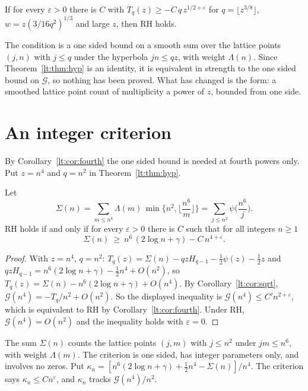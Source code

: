 \begin{corollary}[Reduction]\label{lt:cor:red}
If for every $\varepsilon>0$ there is $C$ with $\overline T_q(z)\ge-C\,q\,z^{1/2+\varepsilon}$ for $q=\lfloor z^{3/8}\rfloor$, $w=z(3/16q^2)^{1/3}$ and large $z$, then RH holds.
\end{corollary}

The condition is a one sided bound on a smooth sum over the lattice points $(j,n)$ with $j\le q$ under the hyperbola $jn\le qz$, with weight $\Lambda(n)$. Since Theorem~\ref{lt:thm:hyp} is an identity, it is equivalent in strength to the one sided bound on $\mathcal G$, so nothing has been proved. What has changed is the form: a smoothed lattice point count of multiplicity a power of $z$, bounded from one side.

\section{An integer criterion}\label{lt:sec:int}
By Corollary~\ref{lt:cor:fourth} the one sided bound is needed at fourth powers only. Put $z=n^4$ and $q=n^2$ in Theorem~\ref{lt:thm:hyp}.

\begin{theorem}\label{lt:thm:int}
Let
\[
\Sigma(n)=\sum_{m\le n^6}\Lambda(m)\,\min\Big\{n^2,\Big\lfloor\frac{n^6}m\Big\rfloor\Big\}=\sum_{j\le n^2}\psi\Big(\frac{n^6}j\Big).
\]
RH holds if and only if for every $\varepsilon>0$ there is $C$ such that for all integers $n\ge1$
\[
\Sigma(n)\ \ge\ n^6\,(2\log n+\gamma)-C\,n^{4+\varepsilon}.
\]
\end{theorem}

\begin{proof}
With $z=n^4$, $q=n^2$: $T_q(z)=\Sigma(n)-qzH_{q-1}-\tfrac12\psi(z)-\tfrac12z$ and $qzH_{q-1}=n^6(2\log n+\gamma)-\tfrac12n^4+O(n^2)$, so $T_q(z)=\Sigma(n)-n^6(2\log n+\gamma)+O(n^4)$. By Corollary~\ref{lt:cor:sqrt}, $\mathcal G(n^4)=-T_q/n^2+O(n^2)$. So the displayed inequality is $\mathcal G(n^4)\le C'n^{2+\varepsilon}$, which is equivalent to RH by Corollary~\ref{lt:cor:fourth}. Under RH, $\mathcal G(n^4)=O(n^2)$ and the inequality holds with $\varepsilon=0$.
\end{proof}

The sum $\Sigma(n)$ counts the lattice points $(j,m)$ with $j\le n^2$ under $jm\le n^6$, with weight $\Lambda(m)$. The criterion is one sided, has integer parameters only, and involves no zeros. Put $\kappa_n=[n^6(2\log n+\gamma)+\tfrac12n^4-\Sigma(n)]/n^4$. The criterion says $\kappa_n\le Cn^\varepsilon$, and $\kappa_n$ tracks $\mathcal G(n^4)/n^2$.

